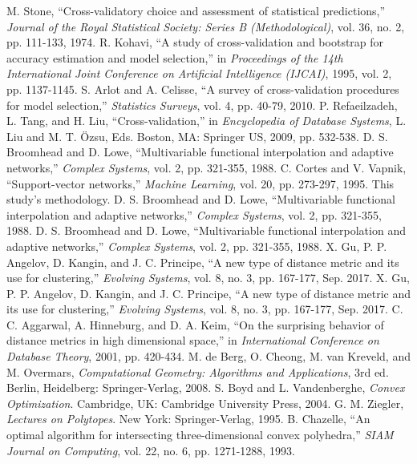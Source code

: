 \documentclass[conference]{IEEEtran}
\begin{document}
\begin{thebibliography}{99}
 M. Stone, “Cross-validatory choice and assessment of statistical predictions,” \textit{Journal of the Royal Statistical Society: Series B (Methodological)}, vol. 36, no. 2, pp. 111-133, 1974.
 R. Kohavi, “A study of cross-validation and bootstrap for accuracy estimation and model selection,” in \textit{Proceedings of the 14th International Joint Conference on Artificial Intelligence (IJCAI)}, 1995, vol. 2, pp. 1137-1145.
 S. Arlot and A. Celisse, “A survey of cross-validation procedures for model selection,” \textit{Statistics Surveys}, vol. 4, pp. 40-79, 2010.
 P. Refaeilzadeh, L. Tang, and H. Liu, “Cross-validation,” in \textit{Encyclopedia of Database Systems}, L. Liu and M. T. Özsu, Eds. Boston, MA: Springer US, 2009, pp. 532-538.
 D. S. Broomhead and D. Lowe, “Multivariable functional interpolation and adaptive networks,” \textit{Complex Systems}, vol. 2, pp. 321-355, 1988.
 C. Cortes and V. Vapnik, “Support-vector networks,” \textit{Machine Learning}, vol. 20, pp. 273-297, 1995.
 This study's methodology.
 D. S. Broomhead and D. Lowe, “Multivariable functional interpolation and adaptive networks,” \textit{Complex Systems}, vol. 2, pp. 321-355, 1988.
 D. S. Broomhead and D. Lowe, “Multivariable functional interpolation and adaptive networks,” \textit{Complex Systems}, vol. 2, pp. 321-355, 1988.
 X. Gu, P. P. Angelov, D. Kangin, and J. C. Principe, “A new type of distance metric and its use for clustering,” \textit{Evolving Systems}, vol. 8, no. 3, pp. 167-177, Sep. 2017.
 X. Gu, P. P. Angelov, D. Kangin, and J. C. Principe, “A new type of distance metric and its use for clustering,” \textit{Evolving Systems}, vol. 8, no. 3, pp. 167-177, Sep. 2017.
 C. C. Aggarwal, A. Hinneburg, and D. A. Keim, “On the surprising behavior of distance metrics in high dimensional space,” in \textit{International Conference on Database Theory}, 2001, pp. 420-434.
 M. de Berg, O. Cheong, M. van Kreveld, and M. Overmars, \textit{Computational Geometry: Algorithms and Applications}, 3rd ed. Berlin, Heidelberg: Springer-Verlag, 2008.
 S. Boyd and L. Vandenberghe, \textit{Convex Optimization}. Cambridge, UK: Cambridge University Press, 2004.
 G. M. Ziegler, \textit{Lectures on Polytopes}. New York: Springer-Verlag, 1995.
 B. Chazelle, “An optimal algorithm for intersecting three-dimensional convex polyhedra,” \textit{SIAM Journal on Computing}, vol. 22, no. 6, pp. 1271-1288, 1993.

\end{thebibliography}
\end{document}
